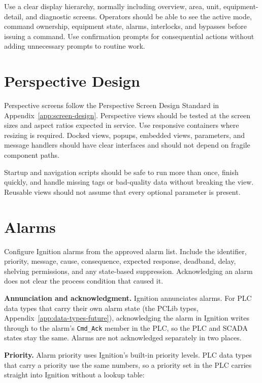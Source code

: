 Use a clear display hierarchy, normally including overview, area, unit, equipment-detail, and diagnostic screens. Operators should be able to see the active mode, command ownership, equipment state, alarms, interlocks, and bypasses before issuing a command. Use confirmation prompts for consequential actions without adding unnecessary prompts to routine work.

\section{Perspective Design}
Perspective screens follow the Perspective Screen Design Standard in Appendix~\ref{app:screen-design}. Perspective views should be tested at the screen sizes and aspect ratios expected in service. Use responsive containers where resizing is required. Docked views, popups, embedded views, parameters, and message handlers should have clear interfaces and should not depend on fragile component paths.

Startup and navigation scripts should be safe to run more than once, finish quickly, and handle missing tags or bad-quality data without breaking the view. Reusable views should not assume that every optional parameter is present.

\section{Alarms}
Configure Ignition alarms from the approved alarm list. Include the identifier, priority, message, cause, consequence, expected response, deadband, delay, shelving permissions, and any state-based suppression. Acknowledging an alarm does not clear the process condition that caused it.

\textbf{Annunciation and acknowledgment.} Ignition annunciates alarms. For PLC data types that carry their own alarm state (the PCLib types, Appendix~\ref{app:data-types-future}), acknowledging the alarm in Ignition writes through to the alarm's \texttt{Cmd\_Ack} member in the PLC, so the PLC and SCADA states stay the same. Alarms are not acknowledged separately in two places. \newmark

\textbf{Priority.} Alarm priority uses Ignition's built-in priority levels. PLC data types that carry a priority use the same numbers, so a priority set in the PLC carries straight into Ignition without a lookup table: \newmark

